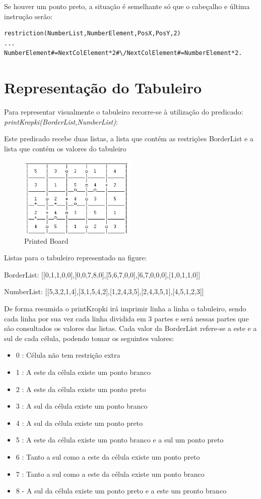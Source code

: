 \documentclass[runningheads,a4paper]{llncs}
\begin{document}
Se houver um ponto preto, a situação é semelhante só que o cabeçalho e última instrução serão:
\begin{verbatim}
restriction(NumberList,NumberElement,PosX,PosY,2)
...
NumberElement#=NextColElement*2#\/NextColElement#=NumberElement*2.
\end{verbatim}

\section{Representação do Tabuleiro}

Para representar visualmente o tabuleiro recorre-se à utilização do predicado:
\textit{printKropki(BorderList,NumberList)}:

Este predicado recebe duas listas, a lista que contém as restrições BorderList e a lista que contém os valores do tabuleiro

\begin{figure}[!ht]
\centering
\includegraphics[width=0.5\textwidth]{tabuleiro1}
\caption{Printed Board}
\end{figure}

Listas para o tabuleiro representado na figure:

BorderList: 
[[0,1,1,0,0],[0,0,7,8,0],[5,6,7,0,0],[6,7,0,0,0],[1,0,1,1,0]]

NumberList: 
[[5,3,2,1,4],[3,1,5,4,2],[1,2,4,3,5],[2,4,3,5,1],[4,5,1,2,3]]


De forma resumida o printKropki irá imprimir linha a linha o tabuleiro, sendo cada linha por sua vez cada linha dividida em 3 partes e será nessas partes que são consultados os valores das listas.
Cada valor da BorderList refere-se a este e a sul de cada célula, podendo tomar os seguintes valores:
\begin{itemize}
\item 0 : Célula não tem restrição extra 
\item 1 : A este da célula existe um ponto branco
\item 2 : A este da célula existe um ponto preto
\item 3 : A sul da célula existe um ponto branco
\item 4 : A sul da célula existe um ponto preto
\item 5 : A este da célula existe um ponto branco e a sul um ponto preto
\item 6 : Tanto a sul como a este da célula existe um ponto preto
\item 7 : Tanto a sul como a este da célula existe um ponto branco
\item 8 - A sul da célula existe um ponto preto e a este um pronto branco
\end{itemize}
\end{document}

